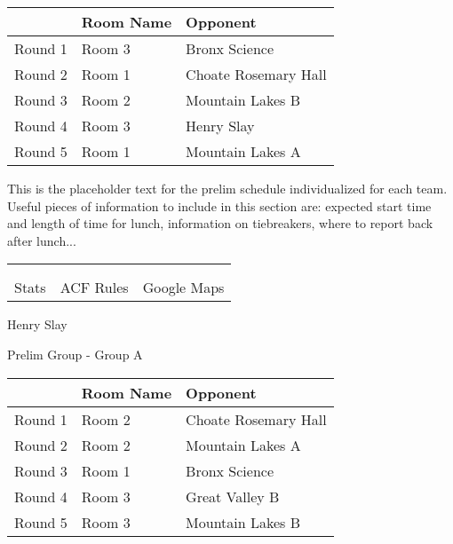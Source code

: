 \documentclass{article}%
\begin{document}
\vspace*{4pt}%
\begin{tabularx}{\textwidth}{|c|Y|Y|}%
\hline%
&Room Name&Opponent\\%
\hline%
Round 1&Room 3&Bronx Science\\%
Round 2&Room 1&Choate Rosemary Hall\\%
Round 3&Room 2&Mountain Lakes B\\%
Round 4&Room 3&Henry Slay\\%
Round 5&Room 1&Mountain Lakes A\\%
\hline%
\end{tabularx}%
\vspace*{30pt}%
\linebreak%
This is the placeholder text for the prelim schedule individualized for each team. Useful pieces of information to include in this section are: expected start time and length of time for lunch, information on tiebreakers, where to report back after lunch...%
\vspace*{30pt}%
\newline%
%
\begin{tabularx}{\textwidth}{YYY}%
  &  &  \\%
\\%
Stats&ACF Rules&Google Maps\\%
\end{tabularx}%
\newpage%
%
\begin{center}%
\begin{Huge}%
Henry Slay%
\end{Huge}%
\vspace*{12pt}%
\linebreak%
\begin{Large}%
Prelim Group {-} Group A%
\end{Large}%
\end{center}%
\vspace*{4pt}%
\begin{tabularx}{\textwidth}{|c|Y|Y|}%
\hline%
&Room Name&Opponent\\%
\hline%
Round 1&Room 2&Choate Rosemary Hall\\%
Round 2&Room 2&Mountain Lakes A\\%
Round 3&Room 1&Bronx Science\\%
Round 4&Room 3&Great Valley B\\%
Round 5&Room 3&Mountain Lakes B\\%
\hline%
\end{tabularx}%
\end{document}
